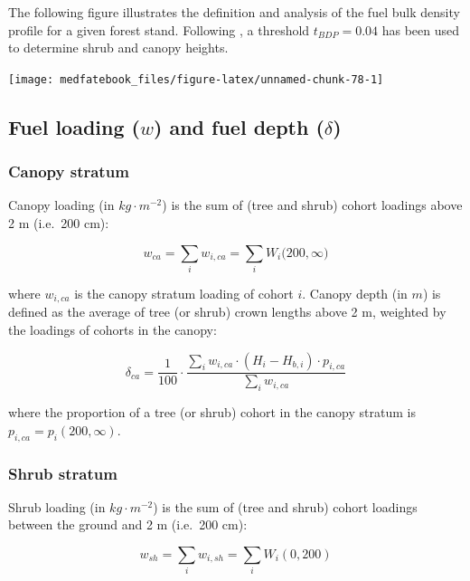 \documentclass[]{book}
\begin{document}
The following figure illustrates the definition and analysis of the fuel
bulk density profile for a given forest stand. Following
\citet{Mitsopoulos2007}, a threshold \(t_{BDP} = 0.04\) has been used to
determine shrub and canopy heights.

\begin{center}\texttt{[image: medfatebook\_files/figure-latex/unnamed-chunk-78-1]} \end{center}

\subsection{\texorpdfstring{Fuel loading (\(w\)) and fuel depth
(\(\delta\))}{Fuel loading (w) and fuel depth (\textbackslash{}delta)}}\label{fuel-loading-w-and-fuel-depth-delta}

\subsubsection{Canopy stratum}\label{canopy-stratum}

Canopy loading (in \(kg\cdot m^{-2}\)) is the sum of (tree and shrub)
cohort loadings above 2 m (i.e.~200 cm):

\begin{equation}
w_{ca} = \sum_{i}w_{i,ca} =\sum_{i}{W_i(200, \infty})
\end{equation}

where \(w_{i,ca}\) is the canopy stratum loading of cohort \(i\). Canopy
depth (in \(m\)) is defined as the average of tree (or shrub) crown
lengths above 2 m, weighted by the loadings of cohorts in the canopy:

\begin{equation}
\delta_{ca} = \frac{1}{100}\cdot\frac{\sum_{i}{w_{i,ca}\cdot (H_i - H_{b,i})\cdot p_{i,ca} }}{\sum_{i}{w_{i,ca}}}
\end{equation}

where the proportion of a tree (or shrub) cohort in the canopy stratum
is \(p_{i,ca}=p_{i}(200,\infty)\).

\subsubsection{Shrub stratum}\label{shrub-stratum}

Shrub loading (in \(kg\cdot m^{-2}\)) is the sum of (tree and shrub)
cohort loadings between the ground and 2 m (i.e.~200 cm):

\begin{equation}
w_{sh} = \sum_{i}w_{i,sh} =\sum_{i}W_i(0, 200)
\end{equation}
\end{document}
